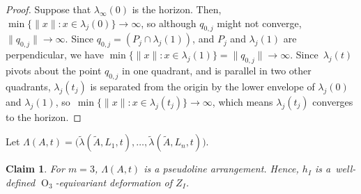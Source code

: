 \documentclass[11pt]{article}
\numberwithin{equation}{section}
\newtheorem{claim}[theorem]{Claim}
\theoremstyle{remark}
\DeclareMathOperator{\orth}{O}
\begin{document}
\begin{proof}
Suppose that $\lambda_\infty(0)$ is the horizon.
Then, $\min \{\|x\| : x \in \lambda_j(0)\} \to \infty$, so
although $q_{0,j}$ might not converge, $\|q_{0,j}\| \to \infty$.
Since $q_{0,j} = (P_{j} \cap \lambda_j(1))$, and $P_{j}$ and $\lambda_j(1)$ are perpendicular, we have $\min \{\|x\| : x \in \lambda_j(1)\} = \|q_{0,j}\| \to \infty$.
Since~$\lambda_j(t)$ pivots about the point $q_{0,j}$ in one quadrant, and is parallel in two other quadrants, $\lambda_j(t_j)$ is separated from the origin by the lower envelope of $\lambda_j(0)$ and $\lambda_j(1)$, so~\hbox{$\min \{\|x\| : x \in \lambda_j(t_j)\} \to \infty$}, which means $\lambda_j(t_j)$ converges to the horizon.
\end{proof}

Let $\Lambda(A,t) = \bigl(\tilde \lambda(\tilde A,L_1,t),\dots,\tilde \lambda(\tilde A,L_n,t)\bigr)$.

\begin{claim}\label{claim-lambda-arrangement-3}
For $m=3$, $\Lambda(A,t)$ is a pseudoline arrangement. Hence, $h_I$ is a~well-defined $\orth_3$-equivariant deformation of $Z_I$.
\end{claim}
\end{document}
